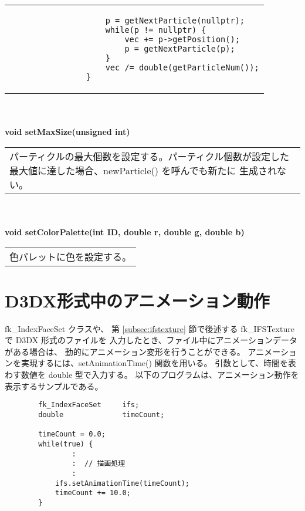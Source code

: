 \begin{tabbing}
\begin{tabular}{p{15cm}}
\begin{screen}
\begin{verbatim}
		            p = getNextParticle(nullptr);
		            while(p != nullptr) {
		                vec += p->getPosition();
		                p = getNextParticle(p);
		            }
		            vec /= double(getParticleNum());
		        }
		\end{verbatim}
		\end{screen}
	\end{tabular} \\ \\

\> \textbf{void setMaxSize(unsigned int)} \\
	\> \> \begin{tabular}{p{15cm}}
		パーティクルの最大個数を設定する。パーティクル個数が設定した
		最大値に達した場合、newParticle() を呼んでも新たに
		生成されない。
	\end{tabular} \\ \\

\> \textbf{void setColorPalette(int ID, double r, double g, double b)} \\
	\> \> \begin{tabular}{p{15cm}}
		色パレットに色を設定する。
	\end{tabular}
\end{tabbing}

\section{D3DX形式中のアニメーション動作} \label{sec:d3dxanimation}
fk\_IndexFaceSet クラスや、
第 \ref{subsec:ifstexture} 節で後述する
fk\_IFSTexture で D3DX 形式のファイルを
入力したとき、ファイル中にアニメーションデータがある場合は、
動的にアニメーション変形を行うことができる。
アニメーションを実現するには、setAnimationTime() 関数を用いる。
引数として、時間を表わす数値を double 型で入力する。
以下のプログラムは、アニメーション動作を表示するサンプルである。
\\
\begin{breakbox}
\begin{verbatim}
        fk_IndexFaceSet     ifs;
        double              timeCount;
        
        timeCount = 0.0;
        while(true) {
                :
                :  // 描画処理
                :
            ifs.setAnimationTime(timeCount);
            timeCount += 10.0;
        }
\end{verbatim}
\end{breakbox} ~

